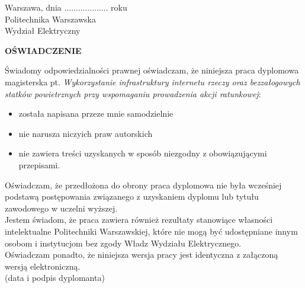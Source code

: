 \newpage
\hfill \hfill Warszawa, dnia ................... roku \\
Politechnika Warszawska\\
Wydział Elektryczny
\vskip 1cm
\begin{center}
 {\large\bf  OŚWIADCZENIE} \\
\end{center}
\vskip 1cm
Świadomy odpowiedzialności prawnej oświadczam, że niniejsza praca dyplomowa magisterska pt. 
\textit{Wykorzystanie infrastruktury internetu rzeczy oraz bezzałogowych statków powietrznych przy wspomaganiu prowadzenia akcji ratunkowej}: 
\begin{itemize}
\item została napisana przeze mnie samodzielnie
\item nie narusza niczyich praw autorskich 
\item nie zawiera treści uzyskanych w sposób niezgodny z obowiązującymi przepisami.
\end{itemize}
Oświadczam, że przedłożona do obrony praca dyplomowa nie była wcześniej podstawą postępowania związanego z uzyskaniem dyplomu lub tytułu zawodowego w uczelni wyższej. \\
Jestem świadom, że praca zawiera również rezultaty stanowiące własności intelektualne Politechniki Warszawskiej, które nie mogą być udostępniane innym osobom i instytucjom bez zgody Władz Wydziału Elektrycznego. \\
Oświadczam ponadto, że niniejsza wersja pracy jest identyczna z załączoną wersją elektroniczną. \\

\vskip 1cm
\noindent
\hfill \hfill (data i podpis dyplomanta)
